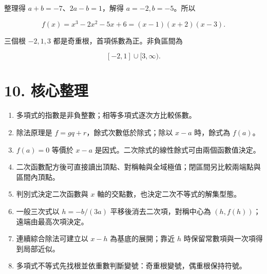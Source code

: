 \documentclass[11pt,a4paper]{article}
\providecommand{\tightlist}{%
  \setlength{\itemsep}{0pt}\setlength{\parskip}{0pt}}
\begin{document}
整理得 \(a+b=-7\)、\(2a-b=1\)，解得 \(\boxed{a=-2,b=-5}\)。所以

\[
f(x)=x^3-2x^2-5x+6=(x-1)(x+2)(x-3).
\]

三個根 \(-2,1,3\) 都是奇重根，首項係數為正。非負區間為

\[
\boxed{[-2,1]\cup[3,\infty)}.
\]

\section{10. 核心整理}\label{ux6838ux5fc3ux6574ux7406}

\begin{enumerate}
\def\labelenumi{\arabic{enumi}.}
\tightlist
\item
  多項式的指數是非負整數；相等多項式逐次方比較係數。
\item
  除法原理是 \(f=gq+r\)，餘式次數低於除式；除以 \(x-a\) 時，餘式為 \(f(a)\)。
\item
  \(f(a)=0\) 等價於 \(x-a\) 是因式。二次除式的線性餘式可由兩個函數值決定。
\item
  二次函數配方後可直接讀出頂點、對稱軸與全域極值；閉區間另比較兩端點與區間內頂點。
\item
  判別式決定二次函數與 \(x\) 軸的交點數，也決定二次不等式的解集型態。
\item
  一般三次式以 \(h=-b/(3a)\) 平移後消去二次項，對稱中心為 \((h,f(h))\)；遠端由最高次項決定。
\item
  連續綜合除法可建立以 \(x-h\) 為基底的展開；靠近 \(h\) 時保留常數項與一次項得到局部近似。
\item
  多項式不等式先找根並依重數判斷變號：奇重根變號，偶重根保持符號。
\end{enumerate}
\end{document}
